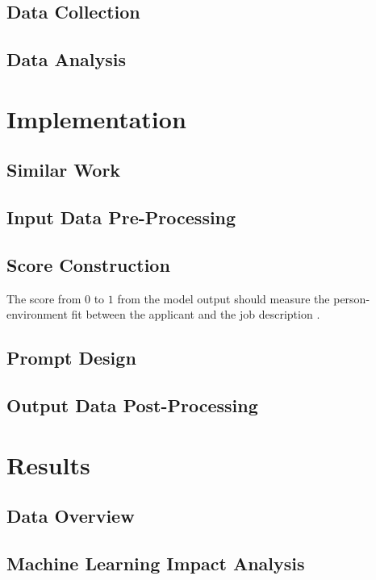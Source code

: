 \documentclass[draft,final]{thesisclass} %
\begin{document}
\section{Data Collection}
\lipsum[1]

\section{Data Analysis}
\lipsum[1]

\chapter{Implementation} \label{implementation}

\section{Similar Work}
\lipsum[1]

\section{Input Data Pre-Processing}
\lipsum[1]

\section{Score Construction}
The score from $0$ to $1$ from the model output should measure the person-environment fit between the applicant and the job description \cite[1]{po_and_pj_fit_literature_review}.

\section{Prompt Design}
\lipsum[1]

\section{Output Data Post-Processing}
\lipsum[1]

\chapter{Results}

\section{Data Overview}
\lipsum[1]

\section{Machine Learning Impact Analysis}
\lipsum[1]
\end{document}

